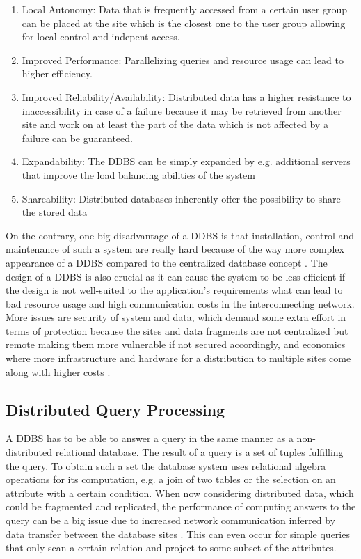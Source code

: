 \begin{enumerate}
    \item Local Autonomy: Data that is frequently accessed from a certain user group can be placed at the site which is the closest one to the user group
            allowing for local control and indepent access.
    \item Improved Performance: Parallelizing queries and resource usage can lead to higher efficiency.
    \item Improved Reliability/Availability: Distributed data has a higher resistance to inaccessibility in case of a failure because it may be retrieved from
            another site and work on at least the part of the data which is not affected by a failure can be guaranteed. 
    \item Expandability: The DDBS can be simply expanded by e.g. additional servers that improve the load balancing abilities of the system
    \item Shareability: Distributed databases inherently offer the possibility to share the stored data
\end{enumerate}

On the contrary, one big disadvantage of a DDBS is that installation, control and maintenance of such a system are really hard because of the way
more complex appearance of a DDBS compared to the centralized database concept \citep{Jadhav2017}. The design of a DDBS is also crucial as it can cause the 
system to be less efficient if the design is not well-suited to the application's requirements what can lead to bad resource usage and high communication 
costs in the interconnecting network. More issues are security of system and data, which demand some extra effort in terms of protection because the sites and 
data fragments are not centralized but remote making them more vulnerable if not secured accordingly, and economics where more infrastructure and hardware for 
a distribution to multiple sites come along with higher costs \cite{Kumar2013}.


\subsection{Distributed Query Processing}
\label{sec:theo_dqp}

A DDBS has to be able to answer a query in the same manner as a non-distributed relational database. The result of a query is a set of tuples fulfilling the
query. To obtain such a set the database system uses relational algebra operations for its computation, e.g. a join of two tables or the selection on an
attribute with a certain condition. When now considering distributed data, which could be fragmented and replicated, the performance of computing answers to
the query can be a big issue due to increased network communication inferred by data transfer between the database sites \cite[p.~173]{Ozsu1991}. This can even
occur for simple queries that only scan a certain relation and project to some subset of the attributes.


